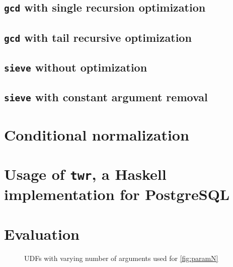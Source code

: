 \subsection{\texttt{gcd} with single recursion optimization}
\subsection{\texttt{gcd} with tail recursive optimization}
\subsection{\texttt{sieve} without optimization}
\subsection{\texttt{sieve} with constant argument removal}
\section{Conditional normalization}
\section{Usage of \texttt{twr}, a Haskell implementation for PostgreSQL}
\label{sql:conditionals}
\section{Evaluation}
\begin{figure}
    \centering
    \caption{UDFs with varying number of arguments used for \autoref{fig:paramN}}
    \label{udfs:paramN}
\end{figure}
